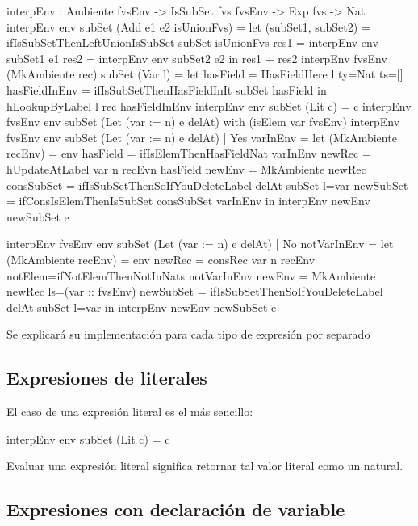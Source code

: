 \begin{code}
interpEnv : Ambiente fvsEnv -> IsSubSet fvs fvsEnv -> Exp fvs -> Nat
interpEnv env subSet (Add e1 e2 isUnionFvs) =
  let (subSet1, subSet2) =
      ifIsSubSetThenLeftUnionIsSubSet subSet isUnionFvs
    res1 = interpEnv env subSet1 e1
    res2 = interpEnv env subSet2 e2
  in res1 + res2
interpEnv {fvsEnv} (MkAmbiente rec) subSet (Var l) =
  let hasField = HasFieldHere {l} {ty=Nat} {ts=[]}
    hasFieldInEnv = ifIsSubSetThenHasFieldInIt subSet hasField
  in hLookupByLabel l rec hasFieldInEnv
interpEnv env subSet (Lit c) = c
interpEnv {fvsEnv} env subSet (Let (var := n) e delAt)
    with (isElem var fvsEnv)
  interpEnv {fvsEnv} env subSet (Let (var := n) e delAt)
    | Yes varInEnv =
    let (MkAmbiente recEnv) = env
      hasField = ifIsElemThenHasFieldNat varInEnv 
      newRec = hUpdateAtLabel var n recEvn hasField
      newEnv = MkAmbiente newRec
      consSubSet =
        ifIsSubSetThenSoIfYouDeleteLabel delAt subSet {l=var}
      newSubSet = ifConsIsElemThenIsSubSet consSubSet varInEnv
    in interpEnv newEnv newSubSet e
 
  interpEnv {fvsEnv} env subSet (Let (var := n) e delAt)
    | No notVarInEnv =
    let (MkAmbiente recEnv) = env
      newRec = consRec var n recEnv
        {notElem=ifNotElemThenNotInNats notVarInEnv}
      newEnv = MkAmbiente newRec {ls=(var :: fvsEnv)}
      newSubSet =
        ifIsSubSetThenSoIfYouDeleteLabel delAt subSet {l=var}
    in interpEnv newEnv newSubSet e
\end{code}

Se explicará su implementación para cada tipo de expresión por separado

\subsection{Expresiones de literales}

El caso de una expresión literal es el más sencillo:

\begin{code}
interpEnv env subSet (Lit c) = c
\end{code}

Evaluar una expresión literal significa retornar tal valor literal como un natural.

\subsection{Expresiones con declaración de variable}

